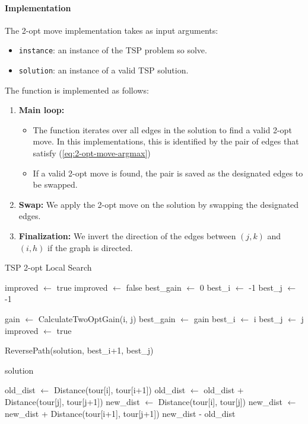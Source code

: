 \documentclass{article}
\begin{document}
\paragraph{Implementation}
The 2-opt move implementation takes as input arguments:
\begin{itemize}
	\item \texttt{instance}: an instance of the TSP problem so solve.
	\item \texttt{solution}: an instance of a valid TSP solution.
\end{itemize}
The function is implemented as follows:
\begin{enumerate}
	\item \textbf{Main loop:} 
	\begin{itemize}
	\item The function iterates over all edges in the solution to find a valid 2-opt move. In this implementations, this is identified by the pair of edges that satisfy (\ref{eq:2-opt-move-argmax})
	\item If a valid 2-opt move is found, the pair is saved as the designated edges to be swapped.
	\end{itemize}
	\item \textbf{Swap:} We apply the 2-opt move on the solution by swapping the designated edges.
	\item \textbf{Finalization:} We invert the direction of the edges between $(j, k)$ and $(i, h)$ if the graph is directed.
\end{enumerate}
\newpage
\begin{algorithm}[!ht]
\caption{TSP 2-opt Local Search}
\begin{algorithmic}[1]
\State improved $\gets$ true
    \State improved $\gets$ false
    \State best\_gain $\gets$ 0
    \State best\_i $\gets$ -1
    \State best\_j $\gets$ -1

            \State gain $\gets$ CalculateTwoOptGain(i, j)
                \State best\_gain $\gets$ gain
                \State best\_i $\gets$ i
                \State best\_j $\gets$ j
                \State improved $\gets$ true
            \EndIf
        \EndFor
    \EndFor

        \State ReversePath(solution, best\_i+1, best\_j)
    \EndIf
\EndWhile

\State \Return solution
\EndProcedure

    \State old\_dist $\gets$ Distance(tour[i], tour[i+1])
    \State old\_dist $\gets$ old\_dist + Distance(tour[j], tour[j+1])
    \State new\_dist $\gets$ Distance(tour[i], tour[j])
    \State new\_dist $\gets$ new\_dist + Distance(tour[i+1], tour[j+1])
    \State \Return new\_dist - old\_dist
\EndFunction
\end{algorithmic}
\end{algorithm}
\end{document}
